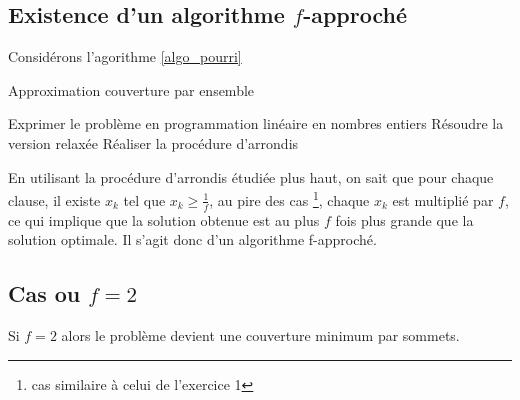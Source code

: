 \subsection{Existence d'un algorithme $f$-approché}

Considérons l'agorithme \ref{algo_pourri}
\begin{algorithm}
	\caption{Approximation couverture par ensemble}
	\label{algo_pourri}
	\begin{algorithmic}[1]
		\STATE Exprimer le problème en programmation linéaire en nombres entiers
		\STATE Résoudre la version relaxée
		\STATE Réaliser la procédure d'arrondis
	\end{algorithmic}
\end{algorithm}

En utilisant la procédure d'arrondis étudiée plus haut, on sait que pour chaque clause, il existe
$x_k$ tel que $x_k \geq \frac{1}{f}$, au pire des cas \footnote{cas similaire à celui de l'exercice
1}, chaque $x_k$ est multiplié par $f$, ce qui implique que la solution obtenue est au plus $f$ fois
plus grande que la solution optimale. Il s'agit donc d'un algorithme f-approché.

\subsection{Cas ou $f=2$}

Si $f=2$ alors le problème devient une couverture minimum par sommets.
